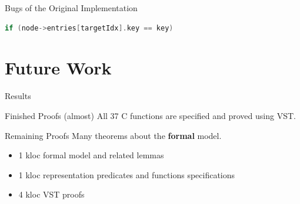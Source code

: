 \documentclass[page number,usenames,dvipsnames]{beamer}
\begin{document}
{\begin{frame}[standout]
    \end{frame}

}

\begin{frame}[fragile]{Bugs of the Original Implementation}
  \begin{lstlisting}[language=C]
if (node->entries[targetIdx].key == key)
  \end{lstlisting}
  \vfill
  \bugcursor
\end{frame}

\section{Future Work}
\begin{frame}{Results}

  \begin{exampleblock}{Finished Proofs}
    {\color{Gray}(almost)} All 37 C functions are specified and proved using VST.
  \end{exampleblock}
  \vfill
  \begin{alertblock}{Remaining Proofs}
    Many theorems about the \textbf{formal} model.
  \end{alertblock}
  \vfill
  \begin{itemize}
  \item 1 kloc formal model and related lemmas
  \item 1 kloc representation predicates and functions specifications
  \item 4 kloc VST proofs
  \end{itemize}
  
\end{frame}
\end{document}
